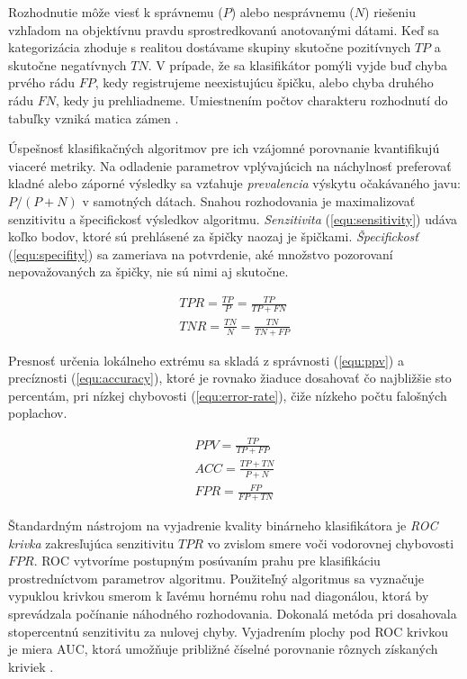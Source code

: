 Rozhodnutie môže viesť k správnemu ($P$) alebo nesprávnemu ($N$) riešeniu vzhľadom na objektívnu pravdu
sprostredkovanú anotovanými dátami. Keď sa kategorizácia zhoduje s realitou dostávame skupiny
skutočne pozitívnych $TP$ a skutočne negatívnych $TN$. V prípade, že sa klasifikátor pomýli vyjde buď chyba
prvého rádu $FP$, kedy registrujeme neexistujúcu špičku, alebo chyba druhého rádu $FN$, kedy ju prehliadneme.
Umiestnením počtov charakteru rozhodnutí do tabuľky vzniká matica zámen \cite{binary-classifier}.

Úspešnosť klasifikačných algoritmov pre ich vzájomné porovnanie kvantifikujú viaceré metriky. Na odladenie parametrov
vplývajúcich na náchylnosť preferovať kladné alebo záporné výsledky sa vzťahuje \emph{prevalencia} výskytu očakávaného
javu: $P / (P+N)$ v samotných dátach. Snahou rozhodovania je maximalizovať senzitivitu a špecifickosť výsledkov algoritmu.
\emph{Senzitivita} (\ref{equ:sensitivity}) udáva koľko bodov, ktoré sú prehlásené za špičky naozaj je špičkami.
\emph{Špecifickosť} (\ref{equ:specifity}) sa zameriava na potvrdenie, aké množstvo pozorovaní nepovažovaných za špičky,
nie sú nimi aj skutočne.
\begin{ceqn}\begin{align}
TPR = \frac{TP}{P} = \frac{TP}{TP + FN} \label{equ:sensitivity} \\
TNR = \frac{TN}{N} = \frac{TN}{TN + FP} \label{equ:specifity}
\end{align}\end{ceqn}

Presnosť určenia lokálneho extrému sa skladá z správnosti (\ref{equ:ppv}) a precíznosti (\ref{equ:accuracy}),
ktoré je rovnako žiaduce dosahovať čo najbližšie sto percentám, pri nízkej chybovosti (\ref{equ:error-rate}), čiže
nízkeho počtu falošných poplachov.
\begin{ceqn}\begin{align}
PPV = \frac{TP}{TP + FP} \label{equ:ppv} \\
ACC = \frac{TP + TN}{P + N}\label{equ:accuracy} \\
FPR = \frac{FP}{FP + TN} \label{equ:error-rate}
\end{align}\end{ceqn}


Štandardným nástrojom na vyjadrenie kvality binárneho klasifikátora je \emph{ROC krivka} zakresľujúca
senzitivitu $TPR$ vo zvislom smere voči vodorovnej chybovosti $FPR$. ROC vytvoríme postupným posúvaním prahu
pre klasifikáciu prostredníctvom parametrov algoritmu. Použiteľný algoritmus sa vyznačuje vypuklou krivkou
smerom k ľavému hornému rohu nad diagonálou, ktorá by sprevádzala počínanie náhodného rozhodovania. Dokonalá
metóda pri dosahovala stopercentnú senzitivitu za nulovej chyby. Vyjadrením plochy pod
ROC krivkou je miera AUC, ktorá umožňuje približné číselné porovnanie rôznych získaných kriviek \cite{roc-analysis}.

